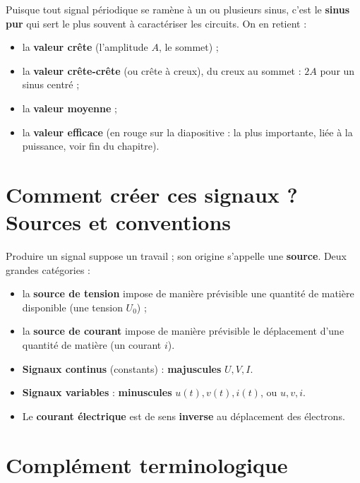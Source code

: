 
Puisque tout signal périodique se ramène à un ou plusieurs sinus, c'est le \textbf{sinus
\og pur\fg{}} qui sert le plus souvent à caractériser les circuits. On en retient :
\begin{itemize}
  \item la \textbf{valeur crête} (l'amplitude $A$, le sommet) ;
  \item la \textbf{valeur crête-crête} (ou crête à creux), du creux au sommet : $2A$ pour un
        sinus centré ;
  \item la \textbf{valeur moyenne} ;
  \item la \textbf{valeur efficace} (en rouge sur la diapositive : la plus importante, liée à
        la puissance, voir fin du chapitre).
\end{itemize}

\section{Comment créer ces signaux ? Sources et conventions}


Produire un signal suppose un travail ; son origine s'appelle une \textbf{source}. Deux
grandes catégories :
\begin{itemize}
  \item la \textbf{source de tension} impose de manière prévisible une quantité de matière
        disponible (une tension $U_0$) ;
  \item la \textbf{source de courant} impose de manière prévisible le déplacement d'une
        quantité de matière (un courant $i$).
\end{itemize}

\begin{defnbox}[title=Premières conventions]
\begin{itemize}
  \item \textbf{Signaux continus} (constants) : \textbf{majuscules} $U, V, I$.
  \item \textbf{Signaux variables} : \textbf{minuscules} $u(t), v(t), i(t)$, ou $u, v, i$.
  \item Le \textbf{courant électrique} est de sens \textbf{inverse} au déplacement des
        électrons.
\end{itemize}
\end{defnbox}

\section{Complément terminologique}

